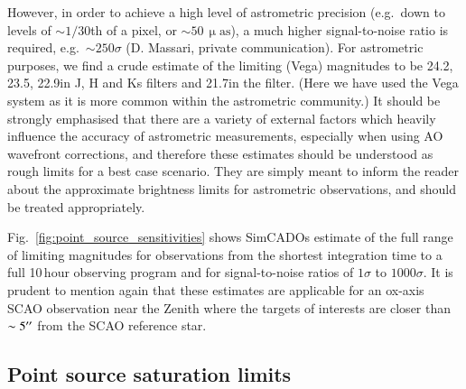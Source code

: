 However, in order to achieve a high level of astrometric precision (e.g.\ down to levels of $\sim 1/30$th of a pixel, or $\sim 50\,\upmu\mathrm{as}$), a much higher signal-to-noise ratio is required, e.g.\ $\sim 250\sigma$ (D. Massari, private communication). For astrometric purposes, we find a crude estimate of the limiting (Vega) magnitudes to be 24.2\m, 23.5\m, 22.9\m in J, H and Ks filters and 21.7\m in the \brgamma filter. (Here we have used the Vega system as it is more common within the astrometric community.) It should be strongly emphasised that there are a variety of external factors which heavily influence the accuracy of astrometric measurements, especially when using AO wavefront corrections, and therefore these estimates should be understood as rough limits for a best case scenario. They are simply meant to inform the reader about the approximate brightness limits for astrometric observations, and should be treated appropriately.

Fig.~\ref{fig:point_source_sensitivities} shows SimCADOs estimate of the full range of limiting magnitudes for observations from the shortest integration time to a full 10\,hour observing program and for signal-to-noise ratios of $1\sigma$ to $1000\sigma$. It is prudent to mention again that these estimates are applicable for an ox-axis SCAO observation near the Zenith where the targets of interests are closer than $\sim5^{\prime\prime}$ from the SCAO reference star.


\subsection{Point source saturation limits}


